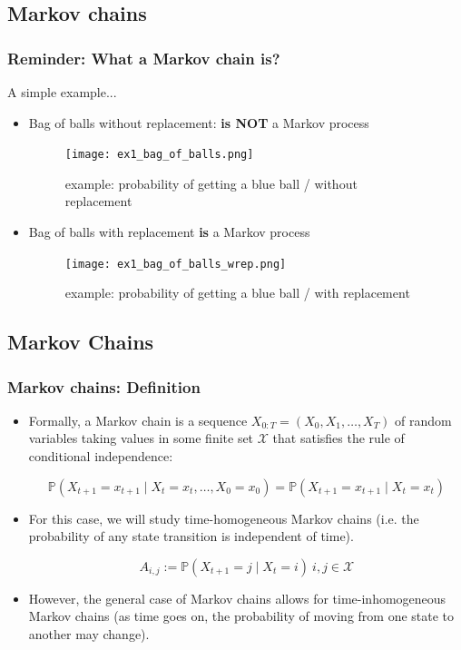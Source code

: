 \documentclass[xcolor=dvipsnames, compress]{beamer}
\begin{document}
\begin{frame}
	\section{Markov chains }
\frametitle{Reminder: What a Markov chain is?}
A simple example...
\begin{itemize}
	\item Bag of balls without replacement: \textbf{is NOT} a Markov process
	\begin{figure}
		\texttt{[image: ex1\_bag\_of\_balls.png]}
		\caption{example: probability of getting a blue ball / without replacement}
	\end{figure}
	\item Bag of balls with replacement \textbf{is} a Markov process
	\begin{figure}
		\texttt{[image: ex1\_bag\_of\_balls\_wrep.png]}
		\caption{example: probability of getting a blue ball / with replacement}
	\end{figure}
\end{itemize}
\end{frame}

\begin{frame}
\section{Markov Chains }
\frametitle{Markov chains: Definition}
\begin{itemize}
	\item Formally, a Markov chain is a sequence $X_{0:T}=\left(X_{0},X_{1},\ldots,X_{T}\right)$  of random variables taking values in some finite set $\mathcal{X}$ that satisfies the rule of conditional independence:

$$
\mathds{P}\left(X_{t+1}=x_{t+1}\mid X_{t}=x_{t},\ldots,X_{0}=x_{0}\right)=\mathds{P}\left(X_{t+1}=x_{t+1}\mid X_{t}=x_{t}\right)
$$

	\item  For this case, we will study time-homogeneous Markov chains (i.e. the probability of any state transition is independent of time).

$$
A_{i,j}:=\mathds{P}\left(X_{t+1}=j\mid X_{t}=i\right)\:i,j\in\mathcal{X}
$$
	\item However, the general case of Markov chains allows for time-inhomogeneous Markov chains (as time goes on, the probability of moving from one state to another may change). 	
\end{itemize}
\end{frame}
\end{document}
